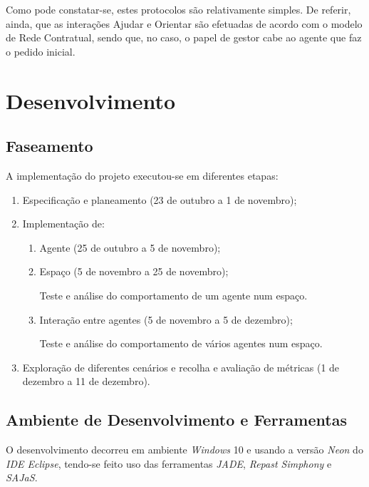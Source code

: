 \documentclass[12pt]{article}
\begin{document}
\begin{titlepage}
\begin{itemize}
\end{itemize}

Como pode constatar-se, estes protocolos são relativamente simples. De referir, ainda, que as interações Ajudar e Orientar são efetuadas de acordo com o modelo de Rede Contratual, sendo que, no caso, o papel de gestor cabe ao agente que faz o pedido inicial. 



\newpage
\section{Desenvolvimento}
\subsection{Faseamento}
A implementação do projeto executou-se em diferentes etapas:
\begin{enumerate}
	\item Especificação e planeamento (23 de outubro a 1 de novembro);
	\item Implementação de:
	 \begin{enumerate} 
	 	\item Agente (25 de outubro a 5 de novembro);
	 	\item Espaço (5 de novembro a 25 de novembro);
	 	
	 	Teste e análise do comportamento de um agente num espaço.
		\item Interação entre agentes (5 de novembro a 5 de dezembro);
		
		Teste e análise do comportamento de vários agentes num espaço. 
	\end{enumerate}
	\item Exploração de diferentes cenários e recolha e avaliação de métricas (1 de dezembro a 11 de dezembro).
\end{enumerate}

\subsection{Ambiente de Desenvolvimento e Ferramentas}
O desenvolvimento decorreu em ambiente \textit{Windows} 10 e usando a versão \textit{Neon} do \textit{IDE Eclipse}, tendo-se feito uso das ferramentas \textit{JADE}, \textit{Repast Simphony} e \textit{SAJaS}.
\newline


\end{titlepage}
\end{document}
